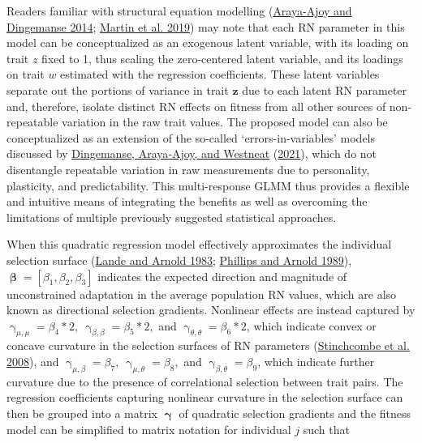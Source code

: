 \documentclass{article}
\begin{document}
Readers familiar with structural equation modelling
(\protect\hyperlink{ref-Araya2014}{Araya-Ajoy and Dingemanse 2014};
\protect\hyperlink{ref-Martin2019}{Martin et al. 2019}) may note that
each RN parameter in this model can be conceptualized as an exogenous
latent variable, with its loading on trait \(z\) fixed to 1, thus
scaling the zero-centered latent variable, and its loadings on trait
\(w\) estimated with the regression coefficients. These latent variables
separate out the portions of variance in trait \(\boldsymbol{z}\) due to
each latent RN parameter and, therefore, isolate distinct RN effects on
fitness from all other sources of non-repeatable variation in the raw
trait values. The proposed model can also be conceptualized as an
extension of the so-called `errors-in-variables' models discussed by
\protect\hyperlink{ref-Ding2021}{Dingemanse, Araya‐Ajoy, and Westneat}
(\protect\hyperlink{ref-Ding2021}{2021}), which do not disentangle
repeatable variation in raw measurements due to personality, plasticity,
and predictability. This multi-response GLMM thus provides a flexible
and intuitive means of integrating the benefits as well as overcoming
the limitations of multiple previously suggested statistical approaches.

When this quadratic regression model effectively approximates the
individual selection surface (\protect\hyperlink{ref-Lande1983}{Lande
and Arnold 1983}; \protect\hyperlink{ref-Phillips1989}{Phillips and
Arnold 1989}),
\(\boldsymbol{\upbeta}=\left[\beta_1,\beta_2,\beta_3 \right]\) indicates
the expected direction and magnitude of unconstrained adaptation in the
average population RN values, which are also known as directional
selection gradients. Nonlinear effects are instead captured by
\(\upgamma _{\mu,\mu}=\beta_4*2, \ \upgamma _{\beta,\beta}= \beta_5*2,\)
and \(\upgamma _{\theta,\theta}= \beta_6*2\), which indicate convex or
concave curvature in the selection surfaces of RN parameters
(\protect\hyperlink{ref-Stinch2008}{Stinchcombe et al. 2008}), and
\(\upgamma _{\mu,\beta}=\beta_7, \ \upgamma _{\mu,\theta}=\beta_8,\) and
\(\upgamma _{\beta,\theta}=\beta_9\), which indicate further curvature
due to the presence of correlational selection between trait pairs. The
regression coefficients capturing nonlinear curvature in the selection
surface can then be grouped into a matrix \(\boldsymbol{\upgamma}\) of
quadratic selection gradients and the fitness model can be simplified to
matrix notation for individual \(j\) such that
\end{document}
